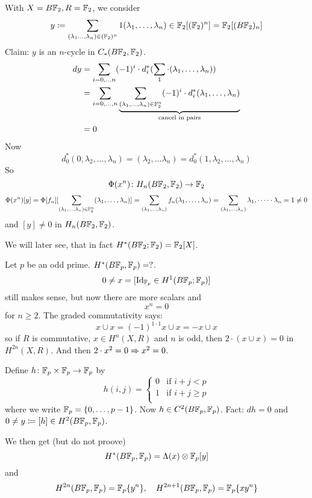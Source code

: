 \documentclass[language=english]{TemplateLecture}
\begin{document}
\begin{example}
    With \(X = B\mathbb{F}_2, R = \mathbb{F}_2\), we consider
    \[y\coloneq \sum_{(\lambda_1 \dots, \lambda_n) \in (\mathbb{F}_2)^n} 1 (\lambda_1, \dots, \lambda_n) \in \mathbb{F}_2[(\mathbb{F}_2)^n] = \mathbb{F}_2[(B\mathbb{F}_2)_n]\]
    Claim: \(y\) is an \(n\)-cycle in \(C_*(B\mathbb{F}_2, \mathbb{F}_2)\).
    \[\begin{split}
        dy &= \sum_{i = 0, \dots n} (-1)^{i} \cdot d_i^*(\sum_1\cdot (\lambda_1, \dots, \lambda_n)) \\
        &= \sum_{i = 0,\dots, n} \underbrace{\sum_{(\lambda_1, \dots, \lambda_n) \in \mathbb{F}_2^n} (-1)^{i} \cdot d_i^*(\lambda_1, \dots, \lambda_n)}_{\text{cancel in pairs}} \\
        &= 0
    \end{split}\]
    Now
    \[d_0^*(0,\lambda_2, \dots, \lambda_n) = (\lambda_2, \dots \lambda_n) = d_0^*(1, \lambda_2, \dots, \lambda_n)\]
    So
    \[\Phi(x^n) \colon H_n(B\mathbb{F}_2, \mathbb{F}_2) \to \mathbb{F}_2\]
    \[\Phi(x^n)[y] = \Phi[f_n][\sum_{(\lambda_1, \dots, \lambda_n) \in \mathbb{F}_2^n}(\lambda_1, \dots, \lambda_n)] = \sum_{(\lambda_1, \dots, \lambda_n)} f_n(\lambda_1, \dots, \lambda_n) = \sum_{(\lambda_1, \dots, \lambda_n)} \lambda_1,\cdot \dots \cdot \lambda_n = 1 \neq 0\]
    and \([y] \neq 0\) in \(H_n(B\mathbb{F}_2, \mathbb{F}_2)\).

    We will later see, that in fact \(H^*(B\mathbb{F}_2;\mathbb{F}_2) = \mathbb{F}_2[X]\).

    \begin{Remark}
        Let \(p\) be an odd prime. \(H^*(B\mathbb{F}_p, \mathbb{F}_p) = ?\).
        \[0 \neq x = [\operatorname{Id}_{\mathbb{F}_p} \in H^1(B\mathbb{F}_p; \mathbb{F}_p)]\]
        still makes sense, but now there are more scalars and
        \[x^n = 0\]
        for \(n \geq 2\). The graded commutativity says:
        \[x\cup x = (-1)^{1\cdot 1} x \cup x = - x\cup x\]
        so if \(R\) is commutative, \(x \in H^n(X,R)\) and \(n\) is odd, then \(2\cdot(x\cup x) = 0\) in \(H^{2n}(X,R)\).
        And then \(2\cdot x^2 = 0 \Rightarrow x^2 = 0\).

        Define \(h \colon \mathbb{F}_p \times \mathbb{F}_p \to \mathbb{F}_p\) by 
        \[h(i,j) = \begin{cases}
            0 & \text{if } i + j < p \\
            1 & \text{if } i+ j \geq p \\
        \end{cases}\]
        where we write \(\mathbb{F}_p = \{0, \dots, p-1\}\). Now \(h \in C^2(B\mathbb{F}_p, \mathbb{F}_p)\). Fact: \(dh = 0\) and \(0 \neq y \coloneq [h] \in H^2(B\mathbb{F}_p, \mathbb{F}_p)\).

        We then get (but do not proove)
        \[H^*(B\mathbb{F}_p, \mathbb{F}_p) = \Lambda(x) \otimes \mathbb{F}_p[y]\] and
        \[H^{2n}(B\mathbb{F}_p, \mathbb{F}_p) = \mathbb{F}_p \{y^n\}, \quad H^{2n+1}(B\mathbb{F}_p, \mathbb{F}_p) = \mathbb{F}_p \{xy^n\}\]
    \end{Remark}
\end{example}
\end{document}
